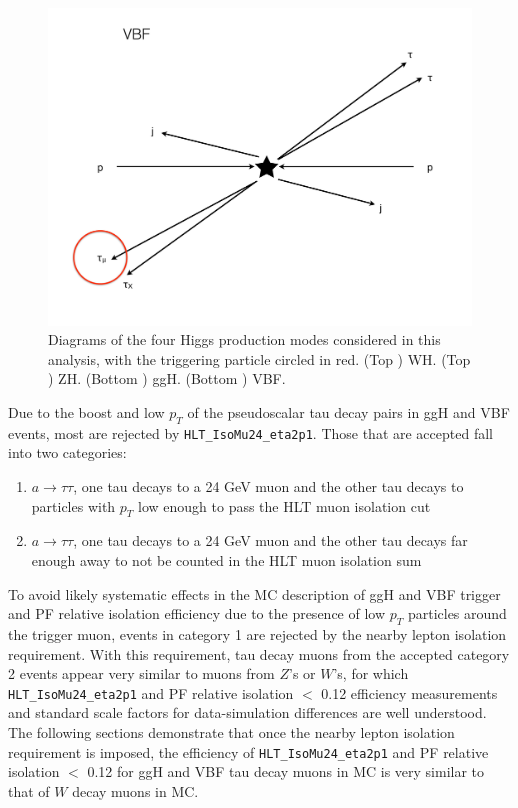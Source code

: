\begin{figure}[hbtp]
\begin{center}
    \includegraphics[width=\cmsFigWidth]{figures/VBF_trigger}
    \caption{Diagrams of the four Higgs production modes considered in this analysis, with the triggering particle circled in red.  (Top \cmsLeft) WH.  (Top \cmsRight) ZH.  (Bottom \cmsLeft) ggH.  (Bottom \cmsRight) VBF.}
    \label{fig:WHZH-vs-ggHVBF-trigger}
  \end{center}
\end{figure}

Due to the boost and low $p_T$ of the pseudoscalar tau decay pairs in ggH and VBF events, most are rejected by \texttt{HLT\_IsoMu24\_eta2p1}.  Those that are accepted fall into two categories:

\begin{enumerate}
\item $a\rightarrow\tau\tau$, one tau decays to a 24 GeV muon and the other tau decays to particles with $p_T$ low enough to pass the HLT muon isolation cut
\item $a\rightarrow\tau\tau$, one tau decays to a 24 GeV muon and the other tau decays far enough away to not be counted in the HLT muon isolation sum
\end{enumerate}

To avoid likely systematic effects in the MC description of ggH and VBF trigger and PF relative isolation efficiency due to the presence of low $p_T$ particles around the trigger muon, events in category 1 are rejected by the nearby lepton isolation requirement.  With this requirement, tau decay muons from the accepted category 2 events appear very similar to muons from $Z$'s or $W$'s, for which \texttt{HLT\_IsoMu24\_eta2p1} and PF relative isolation $<$ 0.12 efficiency measurements and standard scale factors for data-simulation differences are well understood.  The following sections demonstrate that once the nearby lepton isolation requirement is imposed, the efficiency of \texttt{HLT\_IsoMu24\_eta2p1} and PF relative isolation $<$ 0.12 for ggH and VBF tau decay muons in MC is very similar to that of $W$ decay muons in MC.

